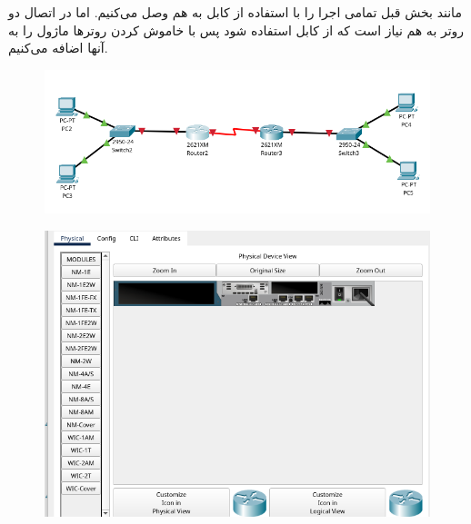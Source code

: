 
مانند بخش قبل تمامی اجرا را با استفاده از کابل  به هم وصل می‌کنیم. اما در اتصال دو روتر به هم نیاز است که از کابل  استفاده شود پس با خاموش کردن روترها ماژول  را به آنها اضافه می‌کنیم. 
\begin{figure}[h]
    \centering
    \includegraphics[width=1\textwidth]{img/12.png}
\end{figure}
\begin{figure}[h]
    \centering
    \includegraphics[width=1\textwidth]{img/11.png}
\end{figure}

